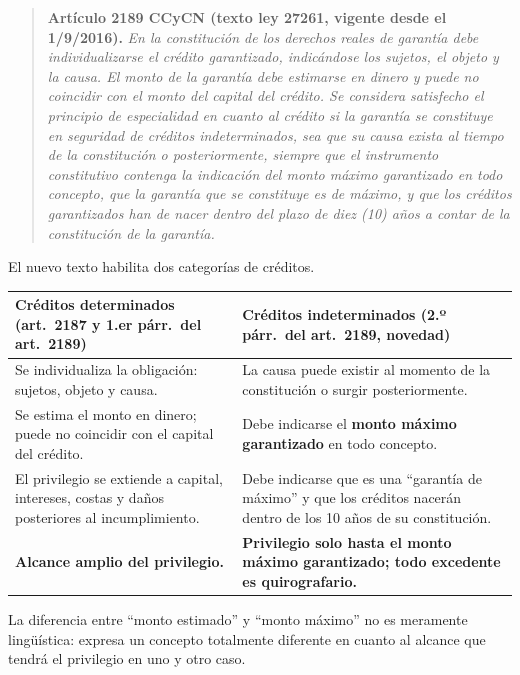 \documentclass[12pt,oneside]{book}
\begin{document}
\begin{quote}
\textbf{Artículo 2189 CCyCN (texto ley 27261, vigente desde el 1/9/2016).} \textit{En la constitución de los derechos reales de garantía debe individualizarse el crédito garantizado, indicándose los sujetos, el objeto y la causa. El monto de la garantía debe estimarse en dinero y puede no coincidir con el monto del capital del crédito. Se considera satisfecho el principio de especialidad en cuanto al crédito si la garantía se constituye en seguridad de créditos indeterminados, sea que su causa exista al tiempo de la constitución o posteriormente, siempre que el instrumento constitutivo contenga la indicación del monto máximo garantizado en todo concepto, que la garantía que se constituye es de máximo, y que los créditos garantizados han de nacer dentro del plazo de diez (10) años a contar de la constitución de la garantía.}
\end{quote}

El nuevo texto habilita dos categorías de créditos.

\begin{table}[H]
\centering
\begin{tabularx}{\textwidth}{@{}LL@{}}
\toprule
\textbf{Créditos determinados (art.~2187 y 1.er párr.\ del art.~2189)} & \textbf{Créditos indeterminados (2.º párr.\ del art.~2189, novedad)} \\
\midrule
Se individualiza la obligación: sujetos, objeto y causa. & La causa puede existir al momento de la constitución o surgir posteriormente. \\
\addlinespace
Se estima el monto en dinero; puede no coincidir con el capital del crédito. & Debe indicarse el \textbf{monto máximo garantizado} en todo concepto. \\
\addlinespace
El privilegio se extiende a capital, intereses, costas y daños posteriores al incumplimiento. & Debe indicarse que es una ``garantía de máximo'' y que los créditos nacerán dentro de los 10 años de su constitución. \\
\addlinespace
\textbf{Alcance amplio del privilegio.} & \textbf{Privilegio solo hasta el monto máximo garantizado; todo excedente es quirografario.} \\
\bottomrule
\end{tabularx}
\end{table}

\begin{important}
La diferencia entre ``monto estimado'' y ``monto máximo'' no es meramente lingüística: expresa un concepto totalmente diferente en cuanto al alcance que tendrá el privilegio en uno y otro caso.
\end{important}
\end{document}
